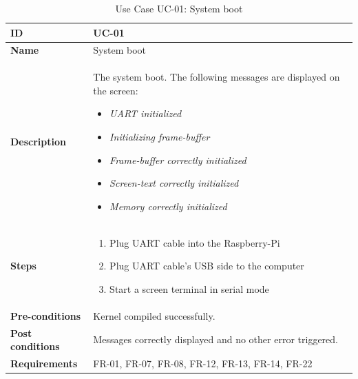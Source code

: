 \begin{table}[H]
    \centering
    \begin{tabular}{| p{3cm} | p{7cm} |}
    \hline
    \textbf{ID}             & UC-01 \\ \hline
    \textbf{Name}           & System boot \\ \hline
    \textbf{Description}    & The system boot. The following messages are displayed on the screen:
    \begin{itemize}
        \item \textit{UART initialized}
        \item \textit{Initializing frame-buffer}
        \item \textit{Frame-buffer correctly initialized}
        \item \textit{Screen-text correctly initialized}
        \item \textit{Memory correctly initialized}    
    \end{itemize}
    \\ \hline
    \textbf{Steps}          &   \begin{enumerate}
                                    \item Plug UART cable into the Raspberry-Pi
                                    \item Plug UART cable's USB side to the computer
                                    \item Start a screen terminal in serial mode
                                \end{enumerate}
 \\ \hline
    \textbf{Pre-conditions} & Kernel compiled successfully. \\ \hline
    \textbf{Post conditions} & Messages correctly displayed and no other error triggered. \\ \hline
    \textbf{Requirements}       &  FR-01, FR-07, FR-08, FR-12, FR-13, FR-14, FR-22\\ \hline
    \end{tabular}
    \caption{Use Case UC-01: System boot}
\end{table}



